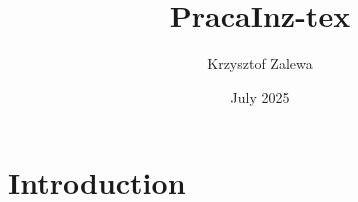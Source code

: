 \documentclass{article}
\title{PracaInz-tex}
\author{Krzysztof Zalewa}
\date{July 2025}
\begin{document}
\maketitle

\section{Introduction}
\end{document}
